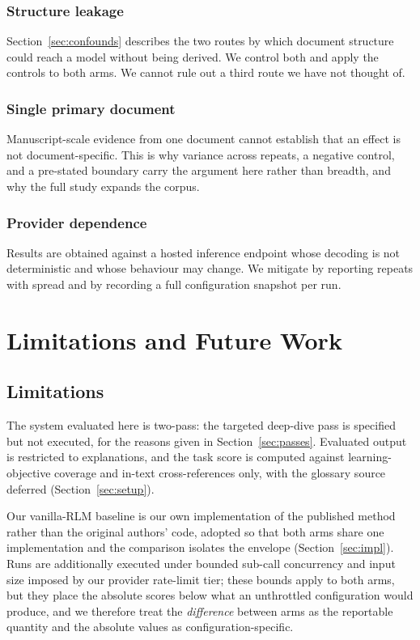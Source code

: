 \documentclass[conference]{IEEEtran}
\begin{document}
\subsubsection{Structure leakage}
Section~\ref{sec:confounds} describes the two routes by which document
structure could reach a model without being derived. We control both and
apply the controls to both arms. We cannot rule out a third route we have not
thought of.

\subsubsection{Single primary document}
Manuscript-scale evidence from one document cannot establish that an effect
is not document-specific. This is why variance across repeats, a negative
control, and a pre-stated boundary carry the argument here rather than
breadth, and why the full study expands the corpus.

\subsubsection{Provider dependence}
Results are obtained against a hosted inference endpoint whose decoding is
not deterministic and whose behaviour may change. We mitigate by reporting
repeats with spread and by recording a full configuration snapshot per run.

\section{Limitations and Future Work}
\label{sec:future}

\subsection{Limitations}
The system evaluated here is two-pass: the targeted deep-dive pass is
specified but not executed, for the reasons given in
Section~\ref{sec:passes}. Evaluated output is restricted to explanations, and
the task score is computed against learning-objective coverage and in-text
cross-references only, with the glossary source deferred
(Section~\ref{sec:setup}).

Our vanilla-RLM baseline is our own implementation of the published method
rather than the original authors' code, adopted so that both arms share one
implementation and the comparison isolates the envelope
(Section~\ref{sec:impl}). Runs are additionally executed under bounded
sub-call concurrency and input size imposed by our provider rate-limit tier;
these bounds apply to both arms, but they place the absolute scores below
what an unthrottled configuration would produce, and we therefore treat the
\emph{difference} between arms as the reportable quantity and the absolute
values as configuration-specific.
\end{document}

